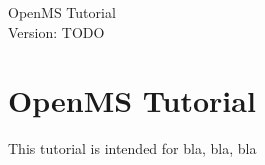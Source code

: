 \documentclass[a4paper]{article}
\begin{document}
\begin{titlepage}
\vspace*{7cm}
\begin{center}
{\Large Open\-MS Tutorial\\[1ex]\large Version: TODO }\\
\end{center}
\end{titlepage}

\section{Open\-MS Tutorial}

This tutorial is intended for bla, bla, bla

\pagebreak

\pagebreak

\end{document}
